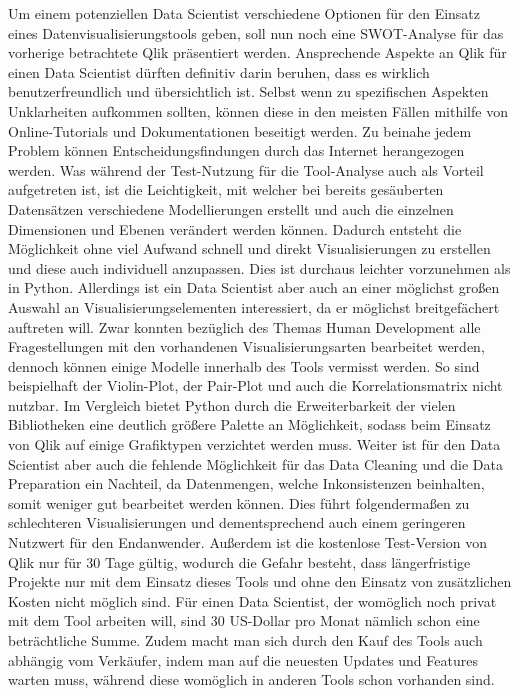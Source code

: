 \documentclass[12pt]{article}
\begin{document}
	Um einem potenziellen Data Scientist verschiedene Optionen für den Einsatz eines
	Datenvisualisierungstools geben, soll nun noch eine SWOT-Analyse für das vorherige
	betrachtete Qlik präsentiert werden.
	Ansprechende Aspekte an Qlik für einen Data Scientist dürften definitiv darin beruhen,
	dass es wirklich benutzerfreundlich und übersichtlich ist. Selbst wenn zu spezifischen
	Aspekten Unklarheiten aufkommen sollten, können diese in den meisten Fällen mithilfe
	von Online-Tutorials und Dokumentationen beseitigt werden. Zu beinahe jedem Problem
	können Entscheidungsfindungen durch das Internet herangezogen werden.
	Was während der Test-Nutzung für die Tool-Analyse auch als Vorteil aufgetreten ist, ist
	die Leichtigkeit, mit welcher bei bereits gesäuberten Datensätzen verschiedene
	Modellierungen erstellt und auch die einzelnen Dimensionen und Ebenen verändert
	werden können.
	Dadurch entsteht die Möglichkeit ohne viel Aufwand schnell und direkt Visualisierungen
	zu erstellen und diese auch individuell anzupassen. Dies ist durchaus leichter
	vorzunehmen als in Python.
	Allerdings ist ein Data Scientist aber auch an einer möglichst großen Auswahl an
	Visualisierungselementen interessiert, da er möglichst breitgefächert auftreten will.
	Zwar konnten bezüglich des Themas Human Development alle Fragestellungen mit den
	vorhandenen Visualisierungsarten bearbeitet werden, dennoch können einige Modelle
	innerhalb des Tools vermisst werden. So sind beispielhaft der Violin-Plot, der Pair-Plot
	und auch die Korrelationsmatrix nicht nutzbar.
	Im Vergleich bietet Python durch die Erweiterbarkeit der vielen Bibliotheken eine
	deutlich größere Palette an Möglichkeit, sodass beim Einsatz von Qlik auf einige
	Grafiktypen verzichtet werden muss.
	Weiter ist für den Data Scientist aber auch die fehlende Möglichkeit für das Data
	Cleaning und die Data Preparation ein Nachteil, da Datenmengen, welche
	Inkonsistenzen beinhalten, somit weniger gut bearbeitet werden können. Dies führt
	folgendermaßen zu schlechteren Visualisierungen und dementsprechend auch einem
	geringeren Nutzwert für den Endanwender.
	Außerdem ist die kostenlose Test-Version von Qlik nur für 30 Tage gültig, wodurch die
	Gefahr besteht, dass längerfristige Projekte nur mit dem Einsatz dieses Tools und ohne
	den Einsatz von zusätzlichen Kosten nicht möglich sind. Für einen Data Scientist, der
	womöglich noch privat mit dem Tool arbeiten will, sind 30 US-Dollar pro Monat nämlich
	schon eine beträchtliche Summe.
	Zudem macht man sich durch den Kauf des Tools auch abhängig vom Verkäufer, indem
	man auf die neuesten Updates und Features warten muss, während diese womöglich in
	anderen Tools schon vorhanden sind.
	
\end{document}
